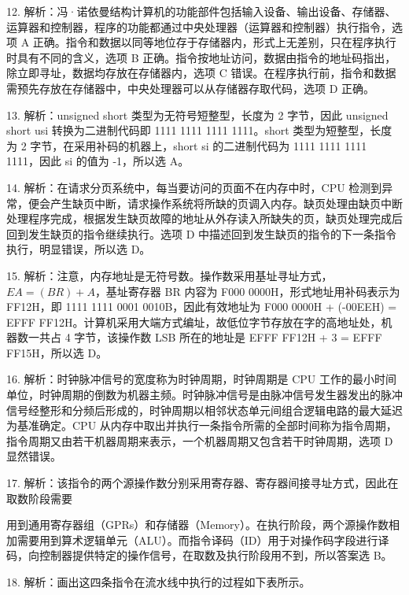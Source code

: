 \documentclass[UTF8,11pt]{ctexart}
\begin{document}
12. 解析：冯·诺依曼结构计算机的功能部件包括输入设备、输出设备、存储器、运算器和控制器，程序的功能都通过中央处理器（运算器和控制器）执行指令，选项 A 正确。指令和数据以同等地位存于存储器内，形式上无差别，只在程序执行时具有不同的含义，选项 B 正确。指令按地址访问，数据由指令的地址码指出，除立即寻址，数据均存放在存储器内，选项 C 错误。在程序执行前，指令和数据需预先存放在存储器中，中央处理器可以从存储器存取代码，选项 D 正确。


13. 解析：unsigned short 类型为无符号短整型，长度为 2 字节，因此 unsigned short usi 转换为二进制代码即 1111 1111 1111 1111。short 类型为短整型，长度为 2 字节，在采用补码的机器上，short si 的二进制代码为 1111 1111 1111 1111，因此 si 的值为 -1，所以选 A。


14. 解析：在请求分页系统中，每当要访问的页面不在内存中时，CPU 检测到异常，便会产生缺页中断，请求操作系统将所缺的页调入内存。缺页处理由缺页中断处理程序完成，根据发生缺页故障的地址从外存读入所缺失的页，缺页处理完成后回到发生缺页的指令继续执行。选项 D 中描述回到发生缺页的指令的下一条指令执行，明显错误，所以选 D。


15. 解析：注意，内存地址是无符号数。操作数采用基址寻址方式，\(\displaystyle EA=(BR)+A\)，基址寄存器 BR 内容为 F000 0000H，形式地址用补码表示为 FF12H，即 1111 1111 0001 0010B，因此有效地址为 F000 0000H + (-00EEH) = EFFF FF12H。计算机采用大端方式编址，故低位字节存放在字的高地址处，机器数一共占 4 字节，该操作数 LSB 所在的地址是 EFFF FF12H + 3 = EFFF FF15H，所以选 D。


16. 解析：时钟脉冲信号的宽度称为时钟周期，时钟周期是 CPU 工作的最小时间单位，时钟周期的倒数为机器主频。时钟脉冲信号是由脉冲信号发生器发出的脉冲信号经整形和分频后形成的，时钟周期以相邻状态单元间组合逻辑电路的最大延迟为基准确定。CPU 从内存中取出并执行一条指令所需的全部时间称为指令周期，指令周期又由若干机器周期来表示，一个机器周期又包含若干时钟周期，选项 D 显然错误。


17. 解析：该指令的两个源操作数分别采用寄存器、寄存器间接寻址方式，因此在取数阶段需要


用到通用寄存器组（GPRs）和存储器（Memory）。在执行阶段，两个源操作数相加需要用到算术逻辑单元（ALU）。而指令译码（ID）用于对操作码字段进行译码，向控制器提供特定的操作信号，在取数及执行阶段用不到，所以答案选 B。


18. 解析：画出这四条指令在流水线中执行的过程如下表所示。
\end{document}
